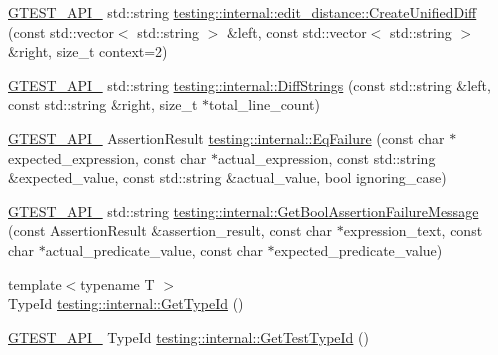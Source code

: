 \begin{DoxyCompactItemize}
\item 
\mbox{\hyperlink{_obj__test_2lib_2googletest-release-1_88_81_2googletest_2include_2gtest_2internal_2gtest-port_8h_aa73be6f0ba4a7456180a94904ce17790}{G\+T\+E\+S\+T\+\_\+\+A\+P\+I\+\_\+}} std\+::string \mbox{\hyperlink{namespacetesting_1_1internal_1_1edit__distance_ac4c24a581ff433d7aca7ed12c9133fb1}{testing\+::internal\+::edit\+\_\+distance\+::\+Create\+Unified\+Diff}} (const std\+::vector$<$ std\+::string $>$ \&left, const std\+::vector$<$ std\+::string $>$ \&right, size\+\_\+t context=2)
\item 
\mbox{\hyperlink{_obj__test_2lib_2googletest-release-1_88_81_2googletest_2include_2gtest_2internal_2gtest-port_8h_aa73be6f0ba4a7456180a94904ce17790}{G\+T\+E\+S\+T\+\_\+\+A\+P\+I\+\_\+}} std\+::string \mbox{\hyperlink{namespacetesting_1_1internal_a513107ff8defa97d949937fc1350a56c}{testing\+::internal\+::\+Diff\+Strings}} (const std\+::string \&left, const std\+::string \&right, size\+\_\+t $\ast$total\+\_\+line\+\_\+count)
\item 
\mbox{\hyperlink{_obj__test_2lib_2googletest-release-1_88_81_2googletest_2include_2gtest_2internal_2gtest-port_8h_aa73be6f0ba4a7456180a94904ce17790}{G\+T\+E\+S\+T\+\_\+\+A\+P\+I\+\_\+}} Assertion\+Result \mbox{\hyperlink{namespacetesting_1_1internal_a08725846ff184d3e79bcf5be4df19157}{testing\+::internal\+::\+Eq\+Failure}} (const char $\ast$expected\+\_\+expression, const char $\ast$actual\+\_\+expression, const std\+::string \&expected\+\_\+value, const std\+::string \&actual\+\_\+value, bool ignoring\+\_\+case)
\item 
\mbox{\hyperlink{_obj__test_2lib_2googletest-release-1_88_81_2googletest_2include_2gtest_2internal_2gtest-port_8h_aa73be6f0ba4a7456180a94904ce17790}{G\+T\+E\+S\+T\+\_\+\+A\+P\+I\+\_\+}} std\+::string \mbox{\hyperlink{namespacetesting_1_1internal_a5fd6e5dc9eb20ab3c3a80e24d89dfac6}{testing\+::internal\+::\+Get\+Bool\+Assertion\+Failure\+Message}} (const Assertion\+Result \&assertion\+\_\+result, const char $\ast$expression\+\_\+text, const char $\ast$actual\+\_\+predicate\+\_\+value, const char $\ast$expected\+\_\+predicate\+\_\+value)
\item 
{\footnotesize template$<$typename T $>$ }\\Type\+Id \mbox{\hyperlink{namespacetesting_1_1internal_a6b108e56fdc68ea937ffb3759fb55ab0}{testing\+::internal\+::\+Get\+Type\+Id}} ()
\item 
\mbox{\hyperlink{_obj__test_2lib_2googletest-release-1_88_81_2googletest_2include_2gtest_2internal_2gtest-port_8h_aa73be6f0ba4a7456180a94904ce17790}{G\+T\+E\+S\+T\+\_\+\+A\+P\+I\+\_\+}} Type\+Id \mbox{\hyperlink{namespacetesting_1_1internal_ad0d66d56ead224263cd100c1d6bfc562}{testing\+::internal\+::\+Get\+Test\+Type\+Id}} ()

\end{DoxyCompactItemize}
